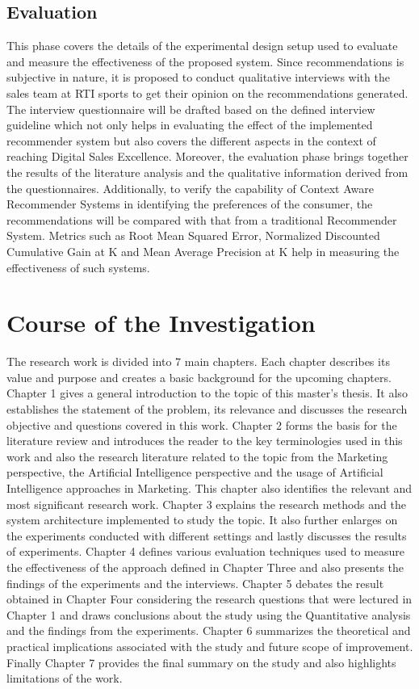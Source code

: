 \subsection{Evaluation}
This phase covers the details of the experimental design setup used to evaluate and measure the effectiveness of the proposed system. Since recommendations is subjective in nature, it is proposed to conduct qualitative interviews with the sales team at RTI sports to get their opinion on the recommendations generated. The interview questionnaire will be drafted based on the defined interview guideline which not only helps in evaluating the effect of the implemented recommender system but also covers the different aspects in the context of reaching Digital Sales Excellence. Moreover, the evaluation phase brings together the results of the literature analysis and the qualitative information derived from the questionnaires.
Additionally, to verify the capability of Context Aware Recommender Systems in identifying the preferences of the consumer, the recommendations will be compared with that from a traditional Recommender System. Metrics such as Root Mean Squared Error, Normalized Discounted Cumulative Gain at K and Mean Average Precision at K help in measuring the effectiveness of such systems.



\section{Course of the Investigation}
The research work is divided into 7 main chapters. Each chapter describes its value and purpose and creates a basic background for the upcoming chapters. Chapter 1 gives a general introduction to the topic of this master’s thesis. It also establishes the statement of the problem, its relevance and discusses the research objective and questions covered in this work. Chapter 2 forms the basis for the literature review and introduces the reader to the key terminologies used in this work and also the research literature related to the topic from the Marketing perspective, the Artificial Intelligence perspective and the usage of Artificial Intelligence approaches in Marketing. This chapter also identifies the relevant and most significant research work. Chapter 3 explains the research methods and the system architecture implemented to study the topic. It also further enlarges on the experiments conducted with different settings and lastly discusses the results of experiments.
Chapter 4 defines various evaluation techniques used to measure the effectiveness of the approach defined in Chapter Three and also presents the findings of the experiments and the interviews. Chapter 5 debates the result obtained in Chapter Four considering the research questions that were lectured in Chapter 1 and draws conclusions about the study using the Quantitative analysis and the findings from the experiments. Chapter 6 summarizes the theoretical and practical implications associated with the study and future scope of improvement. Finally Chapter 7 provides the final summary on the study and also highlights limitations of the work. 

